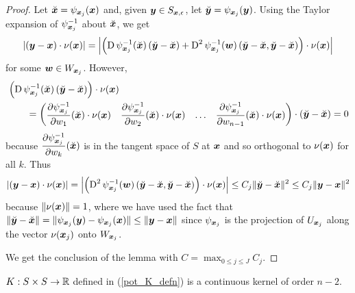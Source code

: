 \begin{proof}
Let $\displaystyle \breve{{\bm{x}}} = \psi_{{\bm{x}}_j}({\bm{x}})$ and, given
$\displaystyle {\bm{y}} \in S_{{\bm{x}},\epsilon}$,
let $\displaystyle \breve{{\bm{y}}} = \psi_{{\bm{x}}_j}({\bm{y}})$.
Using the Taylor expansion of $\psi_{{\bm{x}}_j}^{-1}$ about
$\breve{{\bm{x}}}$, we get
\[
\left|({\bm{y}}- {\bm{x}})\cdot \nu({\bm{x}})\right|
= \left|\left( \operatorname{D} \psi_{{\bm{x}}_j}^{-1}(\breve{{\bm{x}}})
    \left(\breve{{\bm{y}}}- \breve{{\bm{x}}}\right)
+ \operatorname{D}^2 \psi_{{\bm{x}}_j}^{-1}({\bm{w}})
\left(\breve{{\bm{y}}}- \breve{{\bm{x}}},\breve{{\bm{y}}}- \breve{{\bm{x}}}\right)
\right) \cdot \nu({\bm{x}})\right|
\]
for some $\displaystyle {\bm{w}} \in W_{{\bm{x}}_j}$.  However,
\begin{align*}
&\left( \operatorname{D} \psi_{{\bm{x}}_j}^{-1}(\breve{{\bm{x}}})
\left(\breve{{\bm{y}}}- \breve{{\bm{x}}} \right)\right) \cdot
\nu({\bm{x}}) \\
&\qquad = \begin{pmatrix}
\displaystyle
\frac{\partial{\psi^{-1}_{{\bm{x}}_j}}}{\partial w_1}(\breve{{\bm{x}}}) \cdot \nu({\bm{x}}) &
\displaystyle
\frac{\partial{\psi^{-1}_{{\bm{x}}_j}}}{\partial w_2}(\breve{{\bm{x}}}) \cdot \nu({\bm{x}}) &
\ldots &
\displaystyle
\frac{\partial{\psi^{-1}_{{\bm{x}}_j}}}{\partial w_{n-1}}(\breve{{\bm{x}}}) \cdot \nu({\bm{x}})
\end{pmatrix} \cdot
\left(\breve{{\bm{y}}}- \breve{{\bm{x}}} \right) = 0
\end{align*}
because $\displaystyle \frac{\partial{\psi^{-1}_{{\bm{x}}_j}}}{\partial w_k}(\breve{{\bm{x}}})$
is in the tangent space of $S$ at ${\bm{x}}$ and so orthogonal to
$\nu({\bm{x}})$ for all $k$.  Thus
\[
\left|({\bm{y}}- {\bm{x}})\cdot \nu({\bm{x}})\right|
= \left|\left(\operatorname{D}^2 \psi_{{\bm{x}}_j}^{-1}({\bm{w}})
\left(\breve{{\bm{y}}}- \breve{{\bm{x}}},\breve{{\bm{y}}}- \breve{{\bm{x}}}\right)
\right) \cdot \nu({\bm{x}})\right|
\leq C_j \|\breve{{\bm{y}}}- \breve{{\bm{x}}}\|^2
\leq C_j \|{\bm{y}}- {\bm{x}}\|^2
\]
because $\|\nu({\bm{x}})\| = 1$, where we have used the fact that
$\displaystyle \|\breve{{\bm{y}}}- \breve{{\bm{x}}}\|
=\| \psi_{{\bm{x}}_j}({\bm{y}})- \psi_{{\bm{x}}_j}({\bm{x}})\|
\leq \| {\bm{y}}- {\bm{x}}\|$ since
$\displaystyle \psi_{{\bm{x}}_j}$ is the projection of
$\displaystyle U_{{\bm{x}}_j}$ along the vector
$\displaystyle \nu({\bm{x}}_j)$ onto
$\displaystyle W_{{\bm{x}}_j}$.

 We get the conclusion of the lemma with
$\displaystyle C = \max_{0\leq j \leq J} C_j$.
\end{proof}

\begin{lemma} \label{pot_lem_dbl2}
$K: S \times S \rightarrow \mathbb{R}$ defined in
(\ref{pot_K_defn}) is a continuous kernel of order $n-2$.
\end{lemma}

